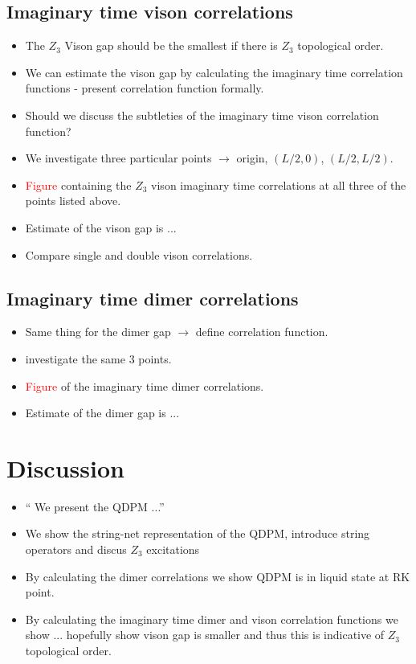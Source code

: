 \documentclass[aps,floatfix,11pt]{revtex4-1}
\begin{document}
    \subsection{Imaginary time vison correlations}
        \begin{itemize}
            \item The $Z_3$ Vison gap should be the smallest if there is $Z_3$ topological order.
            \item We can estimate the vison gap by calculating the imaginary time correlation
                functions - present correlation function formally.
            \item Should we discuss the subtleties of the imaginary time vison correlation function?
            \item We investigate three particular points $\rightarrow$ origin, $(L/2,0)$, $(L/2,L/2)$.
            \item \textcolor{red}{Figure} containing the $Z_3$ vison imaginary time correlations at all three
                of the points listed above.
            \item Estimate of the vison gap is ...
            \item Compare single and double vison correlations.
        \end{itemize}

    \subsection{Imaginary time dimer correlations}
        \begin{itemize}
            \item Same thing for the dimer gap $\rightarrow$ define correlation function.
            \item investigate the same 3 points.
            \item \textcolor{red}{Figure} of the imaginary time dimer correlations.
            \item Estimate of the dimer gap is ...
        \end{itemize}

\clearpage
\section{Discussion}
    \begin{itemize}
        \item `` We present the QDPM ...''
        \item We show the string-net representation of the QDPM, introduce string operators and
            discus $Z_3$ excitations
        \item By calculating the dimer correlations we show QDPM is in liquid state at RK point.
        \item By calculating the imaginary time dimer and vison correlation functions we show ...
            hopefully show vison gap is smaller and thus this is indicative of $Z_3$ topological
            order.
    \end{itemize}
\end{document}
